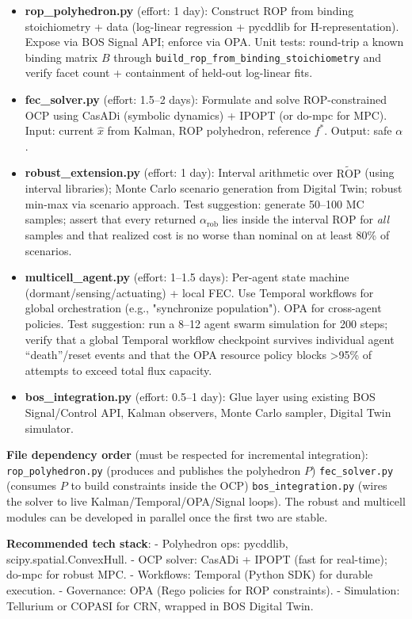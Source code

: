 \documentclass[11pt,a4paper]{article}
\begin{document}
\begin{itemize}
    \item \textbf{rop\_polyhedron.py} (effort: 1 day): Construct ROP from binding stoichiometry + data (log-linear regression + pycddlib for H-representation). Expose via BOS Signal API; enforce via OPA. Unit tests: round-trip a known binding matrix \(B\) through \texttt{build\_rop\_from\_binding\_stoichiometry} and verify facet count + containment of held-out log-linear fits.
    \item \textbf{fec\_solver.py} (effort: 1.5--2 days): Formulate and solve ROP-constrained OCP using CasADi (symbolic dynamics) + IPOPT (or do-mpc for MPC). Input: current \(\hat{x}\) from Kalman, \(\text{ROP}\) polyhedron, reference \(f^*\). Output: safe \(\alpha\).
    \item \textbf{robust\_extension.py} (effort: 1 day): Interval arithmetic over \(\widetilde{\text{ROP}}\) (using interval libraries); Monte Carlo scenario generation from Digital Twin; robust min-max via scenario approach. Test suggestion: generate 50--100 MC samples; assert that every returned \(\alpha_{\text{rob}}\) lies inside the interval ROP for \emph{all} samples and that realized cost is no worse than nominal on at least 80\% of scenarios.
    \item \textbf{multicell\_agent.py} (effort: 1--1.5 days): Per-agent state machine (dormant/sensing/actuating) + local FEC. Use Temporal workflows for global orchestration (e.g., "synchronize population"). OPA for cross-agent policies. Test suggestion: run a 8--12 agent swarm simulation for 200 steps; verify that a global Temporal workflow checkpoint survives individual agent ``death''/reset events and that the OPA resource policy blocks >95\% of attempts to exceed total flux capacity.
    \item \textbf{bos\_integration.py} (effort: 0.5--1 day): Glue layer using existing BOS Signal/Control API, Kalman observers, Monte Carlo sampler, Digital Twin simulator.
\end{itemize}

\textbf{File dependency order} (must be respected for incremental integration):
\texttt{rop\_polyhedron.py} (produces and publishes the polyhedron \(P\)) \to \texttt{fec\_solver.py} (consumes \(P\) to build constraints inside the OCP) \to \texttt{bos\_integration.py} (wires the solver to live Kalman/Temporal/OPA/Signal loops). The robust and multicell modules can be developed in parallel once the first two are stable.

\textbf{Recommended tech stack}:
- Polyhedron ops: pycddlib, scipy.spatial.ConvexHull.
- OCP solver: CasADi + IPOPT (fast for real-time); do-mpc for robust MPC.
- Workflows: Temporal (Python SDK) for durable execution.
- Governance: OPA (Rego policies for ROP constraints).
- Simulation: Tellurium or COPASI for CRN, wrapped in BOS Digital Twin.
\end{document}
